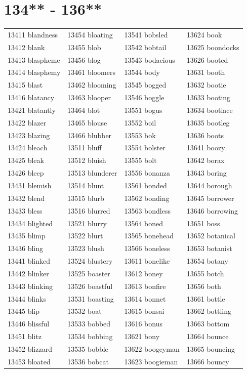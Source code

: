 \documentclass[10pt, oneside]{book}
\begin{document}
\begin{table}
	\centering
	\section*{134** - 136**}
	\begin{tabular}{l l l l}
13411 blandness &13454 bloating &13541 bobsled &13624 book\\
13412 blank &13455 blob &13542 bobtail &13625 boondocks\\
13413 blaspheme &13456 blog &13543 bodacious &13626 booted\\
13414 blasphemy &13461 bloomers &13544 body &13631 booth\\
13415 blast &13462 blooming &13545 bogged &13632 bootie\\
13416 blatancy &13463 blooper &13546 boggle &13633 booting\\
13421 blatantly &13464 blot &13551 bogus &13634 bootlace\\
13422 blazer &13465 blouse &13552 boil &13635 bootleg\\
13423 blazing &13466 blubber &13553 bok &13636 boots\\
13424 bleach &13511 bluff &13554 bolster &13641 boozy\\
13425 bleak &13512 bluish &13555 bolt &13642 borax\\
13426 bleep &13513 blunderer &13556 bonanza &13643 boring\\
13431 blemish &13514 blunt &13561 bonded &13644 borough\\
13432 blend &13515 blurb &13562 bonding &13645 borrower\\
13433 bless &13516 blurred &13563 bondless &13646 borrowing\\
13434 blighted &13521 blurry &13564 boned &13651 boss\\
13435 blimp &13522 blurt &13565 bonehead &13652 botanical\\
13436 bling &13523 blush &13566 boneless &13653 botanist\\
13441 blinked &13524 blustery &13611 bonelike &13654 botany\\
13442 blinker &13525 boaster &13612 boney &13655 botch\\
13443 blinking &13526 boastful &13613 bonfire &13656 both\\
13444 blinks &13531 boasting &13614 bonnet &13661 bottle\\
13445 blip &13532 boat &13615 bonsai &13662 bottling\\
13446 blissful &13533 bobbed &13616 bonus &13663 bottom\\
13451 blitz &13534 bobbing &13621 bony &13664 bounce\\
13452 blizzard &13535 bobble &13622 boogeyman &13665 bouncing\\
13453 bloated &13536 bobcat &13623 boogieman &13666 bouncy\\
	\end{tabular}
 \end{table}
\clearpage
\end{document}
